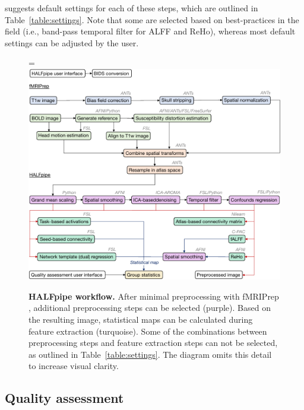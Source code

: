  suggests default settings for each of these steps, which
are outlined in Table~\ref{table:settings}. Note that some are selected based on
best-practices in the field (i.e., band-pass temporal filter for ALFF and
ReHo), whereas most default settings can be adjusted by the user.

\begin{figure}[!tb]
\begin{adjustwidth}{-2.4cm}{}
\hsize=\linewidth%
\includegraphics[width=\linewidth]{fig/workflow-crop}
\caption{\textbf{HALFpipe workflow.} After minimal preprocessing with
fMRIPrep \parencite{10.1038/s41592-018-0235-4}, additional preprocessing
steps can be selected (purple). Based on the resulting image, statistical
maps can be calculated during feature extraction (turquoise). Some of the
combinations between preprocessing steps and feature extraction steps can
not be selected, as outlined in Table~\ref{table:settings}. The diagram
omits this detail to increase visual clarity.}\label{fig:workflow}
\end{adjustwidth}
\end{figure}

\subsection{Quality assessment}\label{sec:qamethods}

